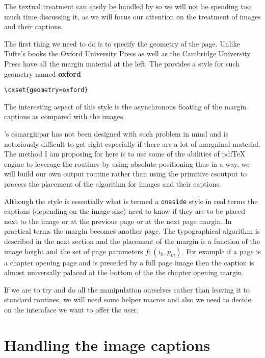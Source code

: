 The textual treatment can easily be handled by \latexe so we will not be spending too much time discussing it, as 
we will focus our attention on the treatment of images and their captions.

The first thing we need to do is to specify the geometry of the page. Unlike Tufte’s books the Oxford University Press as well as the Cambridge University Press have all the margin material at the left. The  provides a style for such geometry named \textbf{oxford}

\begin{scriptexample}{}{}
\begin{verbatim}
\cxset{geometry=oxford}
\end{verbatim}
\end{scriptexample}

The interesting aspect of this style is the asynchronous floating of the margin captions as compared with
the images. 

\latexe’s   cs{marginpar} has not been designed with such problem in mind and is notoriously difficult
to get right especially if there are a lot of margninal material. The method I am proposing for here
is to use some of the abilities of pdfTeX engine to leverage the routines by using absolute positioning
thus in a way, we will build our own output routine rather than using the primitive cs{output} to process
the placement of the algorithm for images and their captions. 

Although the style is essentially what is termed a \texttt{oneside} style in real terms the captions (depending on the image size)  need to know if they are to be placed next to the image or at the previous page or at the next page margin. In practical terms the margin becomes another page. The typographical algorithm is described in the next section and the placement of the margin is a function of the image height and the set of page parameters $f: (i_h, p_m)$. 
For example if a page is a chapter opening page and is preceded  by a full page image then the caption is almost universally palaced at the bottom of the the chapter opening margin.

If we are to try and do all the manipulation ourselves rather than leaving it to standard \latexe routines, we will
need some helper macros and also we need to decide on the interaface we want to offer the user. 

\doubletakeimage

\section{Handling the image captions}

